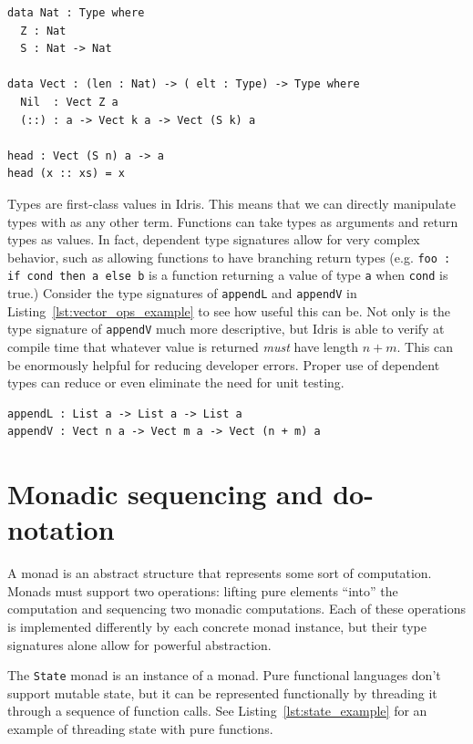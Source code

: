 \documentclass[12pt]{report}
\begin{document}
\begin{lstlisting}[float,caption={Vect Definition},label={lst:vectdef}]
data Nat : Type where
  Z : Nat
  S : Nat -> Nat

data Vect : (len : Nat) -> ( elt : Type) -> Type where
  Nil  : Vect Z a
  (::) : a -> Vect k a -> Vect (S k) a

head : Vect (S n) a -> a
head (x :: xs) = x
\end{lstlisting}

Types are first-class values in Idris.
This means that we can directly manipulate types with as any other term.
Functions can take types as arguments and return types as values.
In fact, dependent type signatures allow for very complex behavior, such as allowing functions to have branching return types (e.g. \texttt{foo : if cond then a else b} is a function returning a value of type \texttt{a} when \texttt{cond} is true.)
Consider the type signatures of \texttt{appendL} and \texttt{appendV} in Listing~\ref{lst:vector_ops_example} to see how useful this can be.
Not only is the type signature of \texttt{appendV} much more descriptive, but Idris is able to verify at compile time that whatever value is returned \textit{must} have length $n + m$.
This can be enormously helpful for reducing developer errors.
Proper use of dependent types can reduce or even eliminate the need for unit testing.

\begin{lstlisting}[float,caption={Vector Operations Example},label={lst:vector_ops_example}]
appendL : List a -> List a -> List a
appendV : Vect n a -> Vect m a -> Vect (n + m) a
\end{lstlisting}

\section{Monadic sequencing and do-notation}

A monad is an abstract structure that represents some sort of computation.
Monads must support two operations: lifting pure elements ``into'' the computation and sequencing two monadic computations.
Each of these operations is implemented differently by each concrete monad instance, but their type signatures alone allow for powerful abstraction.

The \texttt{State} monad is an instance of a monad.
Pure functional languages don't support mutable state, but it can be represented functionally by threading it through a sequence of function calls.
See Listing~\ref{lst:state_example} for an example of threading state with pure functions.
\end{document}
